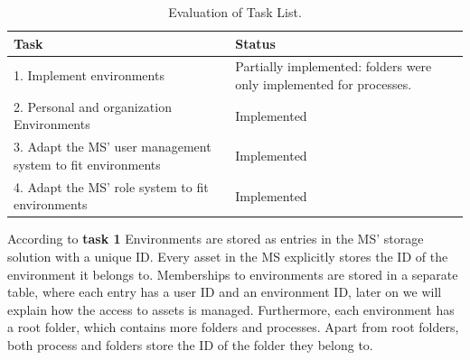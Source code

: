 \begin{table}[H]
	\centering

	\begin{tabular}{ | m{20em} | m{17em}| }
		\hline
		 Task & Status \\
     \hline
      1. Implement environments &  Partially implemented: folders were only implemented for processes. \\
     \hline
      2. Personal and organization Environments &  Implemented \\
     \hline
      3. Adapt the MS' user management system to fit environments &  Implemented \\
     \hline
      4. Adapt the MS' role system to fit environments &  Implemented \\
     \hline
	\end{tabular}

	\caption{Evaluation of Task List.}
	\label{fig:task-list-functional-quick-evaluation}
\end{table}

According to \textbf{task 1} Environments are stored as entries in the MS' storage
solution with a unique ID.
Every asset in the MS explicitly stores the ID of the environment it belongs to.
Memberships to environments are stored in a separate table, where each entry has a user ID
and an environment ID,
later on we will explain how the access to assets is managed.
Furthermore, each environment has a root folder, which contains more folders and
processes.
Apart from root folders, both process and folders store the ID of the folder they belong
to.

